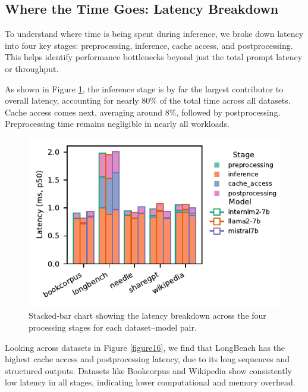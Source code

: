 \documentclass[sigconf,nonacm]{acmart}
\begin{document}
\subsection{Where the Time Goes: Latency Breakdown}
To understand where time is being spent during inference, we broke down latency into four key stages: preprocessing, inference, cache access, and postprocessing. This helps identify performance bottlenecks beyond just the total prompt latency or throughput.

As shown in Figure \ref{figure13}, the inference stage is by far the largest contributor to overall latency, accounting for nearly 80\% of the total time across all datasets. Cache access comes next, averaging around 8\%, followed by postprocessing. Preprocessing time remains negligible in nearly all workloads.
\begin{figure}[H]
    \centering
   \includegraphics[scale=0.9]{figure13.pdf}
    \caption{Stacked‐bar chart showing the latency breakdown across the four processing stages for each dataset–model pair.}
    \label{figure13}
\end{figure}
\par Looking across datasets in Figure \ref{figure16}, we find that LongBench has the highest cache access and postprocessing latency, due to its long sequences and structured outputs. Datasets like Bookcorpus and Wikipedia show consistently low latency in all stages, indicating lower computational and memory overhead.
\end{document}
